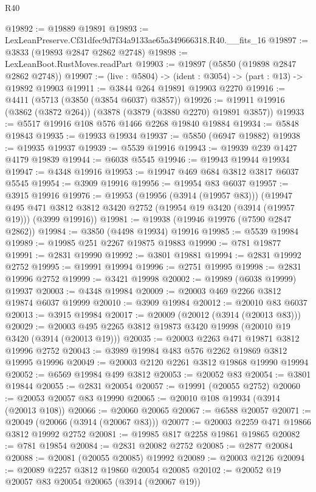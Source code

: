 \begin{lexlean}{R40}
\begin{coremodule}
@19892 := @19889 @19891
@19893 := LexLeanPreserve.Cf31dfec9d7f34a9133ae65a349666318.R40.__fits_16
@19897 := @3833 (@19893 @2847 @2862 @2748)
@19898 := LexLeanBoot.RustMoves.readPart
@19903 := @19897 (@5850 (@19898 @2847 @2862 @2748))
@19907 := (live : @5804) -> (ident : @3054) -> (part : @13) -> @19892 @19903
@19911 := @3844 @264 @19891 @19903 @2270
@19916 := @4411 (@5713 (@3850 (@3854 @6037) @3857))
@19926 := @19911 @19916 (@3862 (@3872 @264)) (@3878 (@3879 (@3880 @2270) @19891 @3857))
@19933 := @5517 @19916 @108 @576 @1466 @2268 @19840 @19884
@19934 := @5848 @19843
@19935 := @19933 @19934
@19937 := @5850 (@6947 @19882)
@19938 := @19935 @19937
@19939 := @5539 @19916
@19943 := @19939 @239 @1427 @4179 @19839
@19944 := @6038 @5545
@19946 := @19943 @19944 @19934
@19947 := @4348 @19916
@19953 := @19947 @469 @684 @3812 @3817 @6037 @5545
@19954 := @3909 @19916
@19956 := @19954 @83 @6037
@19957 := @3915 @19916
@19976 := @19953
    (@19956 (@3914 (@19957 @83)))
    (@19947
      @495
      @471
      @3812
      @3812
      @3420
      @2752
      (@19954 @19 @3420 (@3914 (@19957 @19)))
      (@3999 @19916))
@19981 := @19938 (@19946 @19976 (@7590 @2847 @2862))
@19984 := @3850 (@4498 @19934) @19916
@19985 := @5539 @19984
@19989 := @19985 @251 @2267 @19875 @19883
@19990 := @781 @19877
@19991 := @2831 @19990
@19992 := @3801 @19881
@19994 := @2831 @19992 @2752
@19995 := @19991 @19994
@19996 := @2751 @19995
@19998 := @2831 @19996 @2752
@19999 := @3421 @19998
@20002 := @19989 (@6038 @19999) @19937
@20003 := @4348 @19984
@20009 := @20003 @469 @2266 @3812 @19874 @6037 @19999
@20010 := @3909 @19984
@20012 := @20010 @83 @6037
@20013 := @3915 @19984
@20017 := @20009 (@20012 (@3914 (@20013 @83)))
@20029 := @20003 @495 @2265 @3812 @19873 @3420 @19998 (@20010 @19 @3420 (@3914 (@20013 @19)))
@20035 := @20003 @2263 @471 @19871 @3812 @19996 @2752
@20043 := @3989 @19984 @483 @576 @2262 @19869 @3812 @19995 @19996
@20049 := @20003 @2120 @2261 @3812 @19868 @19990 @19994
@20052 := @6569 @19984 @499 @3812
@20053 := @20052 @83
@20054 := @3801 @19844
@20055 := @2831 @20054
@20057 := @19991 (@20055 @2752)
@20060 := @20053 @20057 @83 @19990
@20065 := @20010 @108 @19934 (@3914 (@20013 @108))
@20066 := @20060 @20065
@20067 := @6588 @20057
@20071 := @20049 (@20066 (@3914 (@20067 @83)))
@20077 := @20003 @2259 @471 @19866 @3812 @19992 @2752
@20081 := @19985 @817 @2258 @19861 @19865
@20082 := @781 @19854
@20084 := @2831 @20082 @2752
@20085 := @2877 @20084
@20088 := @20081 (@20055 @20085) @19992
@20089 := @20003 @2126
@20094 := @20089 @2257 @3812 @19860 @20054 @20085
@20102 := @20052 @19 @20057 @83 @20054 @20065 (@3914 (@20067 @19))

\end{coremodule}
\end{lexlean}
